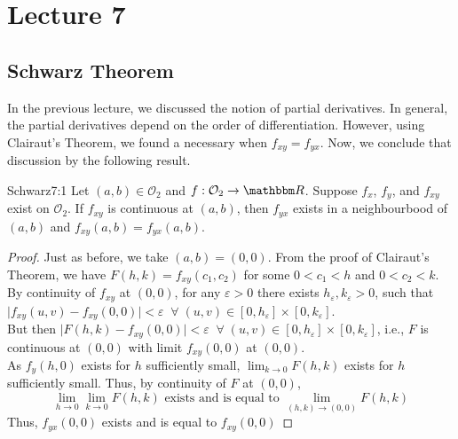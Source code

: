 \documentclass[../Analysis-3]{subfiles}
\begin{document}
\chapter*{Lecture 7} %
\setcounter{chapter}{7} %
\setcounter{section}{0}



\section{Schwarz Theorem}

In the previous lecture, we discussed the notion of partial derivatives. In general, the partial derivatives depend on the order of differentiation. However, using Clairaut's Theorem, we found a necessary when $f_{xy} = f_{yx}$. Now, we conclude that discussion by the following result.

\begin{Thm}{Schwarz}{7:1}
  Let $(a,b) \in \mathcal{O}_2$ and $f:\mathcal{O}_2 \to \R$. Suppose $f_x$, $f_y$, and $f_{xy}$ exist on $\mathcal{O}_2$. If $f_{xy}$ is continuous at $(a,b)$, then $f_{yx}$ exists in a neighbourbood of $(a,b)$ and $f_{xy}(a,b) = f_{yx}(a,b)$.
\end{Thm}

\begin{proof}
  Just as before, we take $(a,b) = (0,0)$. From the proof of Clairaut's Theorem, we have $F(h,k) = f_{xy}(c_1, c_2)$ for some $0 < c_1< h$ and $0 < c_2 < k$. By continuity of $f_{xy}$ at $(0,0)$, for any $\varepsilon >0$ there exists $h_\varepsilon, k_\varepsilon > 0$, such that $\mid f_{xy}(u,v)- f_{xy}(0,0)\mid < \varepsilon \;\;\forall \; (u,v) \in [0,h_\varepsilon]\times[0,k_\varepsilon]$. \\
  But then $\mid F(h,k) - f_{xy}(0,0) \mid < \varepsilon \;\;\forall \; (u,v) \in [0,h_\varepsilon]\times[0,k_\varepsilon]$, i.e., $F$ is continuous at $(0,0)$ with limit $f_{xy}(0,0)$ at $(0,0)$.\\
  As $f_y(h,0)$ exists for $h$ sufficiently small, $\lim_{k \to 0} F(h,k)$ exists for $h$ sufficiently small. Thus, by continuity of $F$ at $(0,0)$,
  \[\lim_{h \to 0}\lim_{k \to 0} F(h,k) \text{  exists and is equal to  }\lim_{(h,k) \to (0,0)} F(h,k)\]
  Thus, $f_{yx}(0,0)$ exists and is equal to $f_{xy}(0,0)$
\end{proof}

\vspace{.2 cm}
\end{document}

